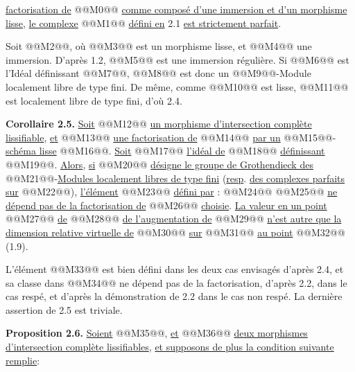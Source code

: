 
\uline{factorisation de} @@M0@@ \uline{comme composé d'une immersion et d'un morphisme lisse}, \uline{le complexe} @@M1@@ \uline{défini en} 2.1 \uline{est strictement parfait}.

Soit @@M2@@, où @@M3@@ est un morphisme lisse, et @@M4@@ une immersion. D'après 1.2, @@M5@@ est une immersion régulière. Si @@M6@@ est l'Idéal définissant @@M7@@, @@M8@@ est donc un @@M9@@-Module localement libre de type fini. De même, comme @@M10@@ est lisse, @@M11@@ est localement libre de type fini, d'où 2.4.

\textbf{Corollaire 2.5.} \uline{Soit} @@M12@@ \uline{un morphisme d'intersection complète lissifiable}, \uline{et} @@M13@@ \uline{une factorisation de} @@M14@@ \uline{par un} @@M15@@-\uline{schéma lisse} @@M16@@. \uline{Soit} @@M17@@ \uline{l'idéal de} @@M18@@ \uline{définissant} @@M19@@. \uline{Alors}, \uline{si} @@M20@@ \uline{désigne le groupe de Grothendieck des} @@M21@@-\uline{Modules localement libres de type fini} (\uline{resp}. \uline{des complexes parfaits sur} @@M22@@), \uline{l'élément} @@M23@@ \uline{défini par} :
@@M24@@
@@M25@@
\uline{ne dépend pas de la factorisation de} @@M26@@ \uline{choisie}. \uline{La valeur en un point} @@M27@@ \uline{de} @@M28@@ \uline{de l'augmentation de} @@M29@@ \uline{n'est autre que la dimension relative virtuelle de} @@M30@@ \uline{sur} @@M31@@ \uline{au point} @@M32@@ (1.9).

L'élément @@M33@@ est bien défini dans les deux cas envisagés d'après 2.4, et sa classe dans @@M34@@ ne dépend pas de la factorisation, d'après 2.2, dans le cas respé, et d'après la démonstration de 2.2 dans le cas non respé. La dernière assertion de 2.5 est triviale.

\textbf{Proposition 2.6.} \uline{Soient} @@M35@@, \uline{et} @@M36@@ \uline{deux morphismes d'intersection complète lissifiables}, \uline{et supposons de plus la condition suivante remplie}:

